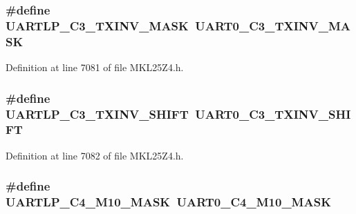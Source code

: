 \subsubsection[{\texorpdfstring{U\+A\+R\+T\+L\+P\+\_\+\+C3\+\_\+\+T\+X\+I\+N\+V\+\_\+\+M\+A\+SK}{UARTLP_C3_TXINV_MASK}}]{\setlength{\rightskip}{0pt plus 5cm}\#define U\+A\+R\+T\+L\+P\+\_\+\+C3\+\_\+\+T\+X\+I\+N\+V\+\_\+\+M\+A\+SK~{\bf U\+A\+R\+T0\+\_\+\+C3\+\_\+\+T\+X\+I\+N\+V\+\_\+\+M\+A\+SK}}\hypertarget{group___backward___compatibility___symbols_gad07163dc482ca87cdab056c680c081c2}{}\label{group___backward___compatibility___symbols_gad07163dc482ca87cdab056c680c081c2}


Definition at line 7081 of file M\+K\+L25\+Z4.\+h.

\subsubsection[{\texorpdfstring{U\+A\+R\+T\+L\+P\+\_\+\+C3\+\_\+\+T\+X\+I\+N\+V\+\_\+\+S\+H\+I\+FT}{UARTLP_C3_TXINV_SHIFT}}]{\setlength{\rightskip}{0pt plus 5cm}\#define U\+A\+R\+T\+L\+P\+\_\+\+C3\+\_\+\+T\+X\+I\+N\+V\+\_\+\+S\+H\+I\+FT~{\bf U\+A\+R\+T0\+\_\+\+C3\+\_\+\+T\+X\+I\+N\+V\+\_\+\+S\+H\+I\+FT}}\hypertarget{group___backward___compatibility___symbols_gac43e73179815a02e03de14d95c1d29f0}{}\label{group___backward___compatibility___symbols_gac43e73179815a02e03de14d95c1d29f0}


Definition at line 7082 of file M\+K\+L25\+Z4.\+h.

\subsubsection[{\texorpdfstring{U\+A\+R\+T\+L\+P\+\_\+\+C4\+\_\+\+M10\+\_\+\+M\+A\+SK}{UARTLP_C4_M10_MASK}}]{\setlength{\rightskip}{0pt plus 5cm}\#define U\+A\+R\+T\+L\+P\+\_\+\+C4\+\_\+\+M10\+\_\+\+M\+A\+SK~{\bf U\+A\+R\+T0\+\_\+\+C4\+\_\+\+M10\+\_\+\+M\+A\+SK}}\hypertarget{group___backward___compatibility___symbols_gae6f095de7ec64e7c5f070cace84825f2}{}\label{group___backward___compatibility___symbols_gae6f095de7ec64e7c5f070cace84825f2}


